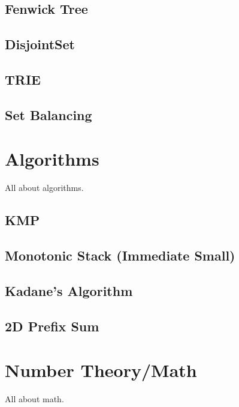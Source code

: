 \documentclass[10pt, a4paper]{article}
\begin{document}
\begin{multicols}{2}
\subsection{Fenwick Tree}


\subsection{DisjointSet}


\subsection{TRIE}


\subsection{Set Balancing}


\section{Algorithms}
All about algorithms.

\subsection{KMP}


\subsection{Monotonic Stack (Immediate \allowbreak Small)}


\subsection{Kadane’s Algorithm}


\subsection{2D Prefix Sum}


\section{Number Theory/Math}
All about math.


\end{multicols}
\end{document}
